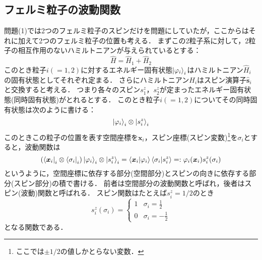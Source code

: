 \documentclass[a4paper,11pt]{jsarticle}
\begin{document}
\subsection{フェルミ粒子の波動関数}
問題(1)では2つのフェルミ粒子のスピンだけを問題にしていたが，ここからはそれに加えて2つのフェルミ粒子の位置も考える．
まずこの2粒子系に対して，2粒子の相互作用のないハミルトニアンが与えられているとする：
\begin{equation}
  \hat{H} = \hat{H}_1 + \hat{H}_2
\end{equation}
このとき粒子$i(=1,2)$に対するエネルギー固有状態$\ket{\varphi_i}_i$はハミルトニアン$\hat{H}_i$の固有状態としてそれぞれ定まる．
さらにハミルトニアン$H_i$はスピン演算子$\hat{\bm{s}}_i$と交換すると考える．
つまり各々のスピン$s^z_1$，$s^z_2$が定まったエネルギー固有状態(同時固有状態)がとれるとする．
このとき粒子$i(=1,2)$についてその同時固有状態は次のように書ける：
\begin{equation}
  \ket{\varphi_i}_i\otimes\ket{s^z_i}_i
  \label{space_spin}
\end{equation}
このときこの粒子の位置を表す空間座標を$\bm{x}_i$，スピン座標(スピン変数)\footnote{ここでは$\pm 1/2$の値しかとらない変数．}を$\sigma_i$とすると，波動関数は
\begin{equation}
  (\bra{\bm{x}_i}_i\otimes\bra{\sigma_i}_i)\ket{\varphi_i}_i\otimes\ket{s^z_i}_i = \braket{\bm{x}_i}{\varphi_i} \braket{\sigma_i}{s^z_i} =: \varphi_i(\bm{x}_i) s^z_i(\sigma_i) 
\end{equation}
というように，空間座標に依存する部分(空間部分)とスピンの向きに依存する部分(スピン部分)の積で書ける．
前者は空間部分の波動関数と呼ばれ，後者はスピン(波動)関数と呼ばれる．
スピン関数はたとえば$s^z_i=1/2$のとき
\begin{equation}
  s^z_i(\sigma_i) = \left\{
  \begin{array}{ll}
    1  & \sigma_i = \frac{1}{2}\\
    0 & \sigma_i = -\frac{1}{2}
  \end{array}\right.
\end{equation}
となる関数である．
\end{document}
